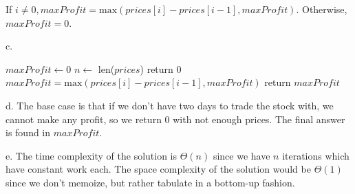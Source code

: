 \documentclass[12pt]{article}
\begin{document}
If $i \ne 0, maxProfit = \text{max} (prices[i]-prices[i-1], maxProfit)$. Otherwise, $maxProfit = 0$.

c. 

\begin{algorithmic}
    \State $maxProfit \gets 0$
    \State $n \gets $ len($prices$)
            \State return 0
        \EndIf
            \State $maxProfit = \text{max}(prices[i]-prices[i-1], maxProfit)$
        \EndFor
        \State return $maxProfit$
    \EndProcedure
\end{algorithmic}

d. The base case is that if we don't have two days to trade the stock with, we cannot make any profit, so we return 0 with not enough prices. The final answer is found in $maxProfit$.

e. The time complexity of the solution is $\Theta(n)$ since we have $n$ iterations which have constant work each. The space complexity of the solution would be $\Theta(1)$ since we don't memoize, but rather tabulate in a bottom-up fashion.
\end{document}
